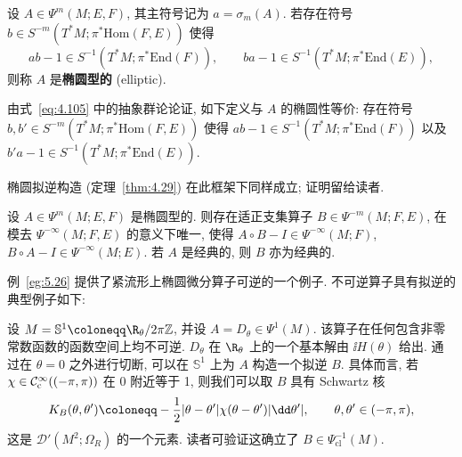\begin{definition}[椭圆性]\label{def:5.48}\sloppy
设 $A \in \Psi^m(M; E, F)$, 其主符号记为 $a = \sigma_m(A)$. 若存在符号 $b \in S^{-m}(T^* M; \pi^* \mathrm{Hom}(F, E))$ 使得
\[
    a b - 1 \in S^{-1}(T^* M; \pi^* \mathrm{End}(F)), \qquad b a - 1 \in S^{-1}(T^* M; \pi^* \mathrm{End}(E)),
\]
则称 $A$ 是\textbf{椭圆型的} (elliptic).
\end{definition}

\begin{remark}[椭圆性的等价定义]\label{rem:5.49}
由式~\eqref{eq:4.105} 中的抽象群论论证, 如下定义与 $A$ 的椭圆性等价: 存在符号 $b, b' \in S^{-m}(T^* M; \pi^* \mathrm{Hom}(F, E))$ 使得 $a b - 1 \in S^{-1}(T^* M; \pi^* \mathrm{End}(F))$ 以及 $b' a - 1 \in S^{-1}(T^* M; \pi^* \mathrm{End}(E))$.
\end{remark}

椭圆拟逆构造 (定理~\ref{thm:4.29}) 在此框架下同样成立; 证明留给读者.

\begin{theorem}[椭圆拟逆]\label{thm:5.50}
设 $A \in \Psi^m(M; E, F)$ 是椭圆型的. 则存在适正支集算子 $B \in \Psi^{-m}(M; F, E)$, 在模去 $\Psi^{-\infty}(M; F, E)$ 的意义下唯一, 使得 $A \circ B - I \in \Psi^{-\infty}(M; F)$, $B \circ A - I \in \Psi^{-\infty}(M; E)$. 若 $A$ 是经典的, 则 $B$ 亦为经典的.
\end{theorem}

例~\ref{eg:5.26} 提供了紧流形上椭圆微分算子可逆的一个例子. 不可逆算子具有拟逆的典型例子如下:

\begin{example}[圆周上的导数算子]\label{eg:5.51}
设 $M = \mathbb{S}^1 \defeq \R_\theta / 2\pi\mathbb{Z}$, 并设 $A = D_\theta \in \Psi^1(M)$. 该算子在任何包含非零常数函数的函数空间上均不可逆. $D_\theta$ 在 $\R_\theta$ 上的一个基本解由 $\ii H(\theta)$ 给出. 通过在 $\theta = 0$ 之外进行切断, 可以在 $\mathbb{S}^1$ 上为 $A$ 构造一个拟逆 $B$. 具体而言, 若 $\chi \in \mathcal{C}_{\mathrm{c}}^\infty((-\pi, \pi))$ 在 $0$ 附近等于 1, 则我们可以取 $B$ 具有 Schwartz 核
\begin{equation}\label{eq:5.109}
    K_B(\theta, \theta') \defeq -\frac{1}{2} |\theta - \theta'| \chi(\theta - \theta') |\dd\theta'|, \qquad \theta, \theta' \in (-\pi, \pi),
\end{equation}
这是 $\mathcal{D}'(M^2; \Omega_R)$ 的一个元素. 读者可验证这确立了 $B \in \Psi_{\mathrm{cl}}^{-1}(M)$.
\end{example}

